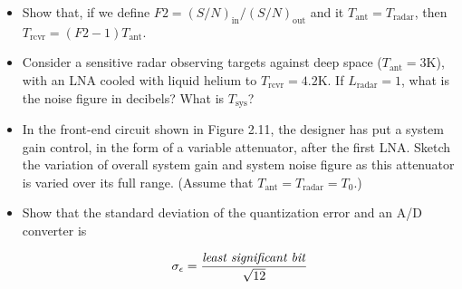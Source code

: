 \documentclass[letterpaper,10pt]{article}\usepackage[]{graphicx}\usepackage[]{color}
\newcommand{\question}[3]{
\begin{itemize}
\item[{\makebox[1cm]{#1)}}] #2

\vspace{.2in}

#3

\end{itemize}

\vspace{.2in}
}
\begin{document}
\question{2.2}{
Show that, if we define $F2=(S/N)_\text{in}/(S/N)_\text{out}$ and it $T_\text{ant}=T_\text{radar}$, then $T_\text{rcvr}=(F2-1)T_\text{ant}$.
}{}

\question{2.3}{
Consider a sensitive radar observing targets against deep space ($T_\text{ant}=3\text{K}$), with an LNA cooled with liquid helium to $T_\text{rcvr}=4.2\text{K}$.  If $L_\text{radar}=1$, what is the noise figure in decibels?  What is $T_\text{sys}$?
}{}

\question{2.4}{
In the front-end circuit shown in Figure 2.11, the designer has put a system gain control, in the form of a variable attenuator, after the first LNA.  Sketch the variation of overall system gain and system noise figure as this attenuator is varied over its full range. (Assume that $T_\text{ant}=T_\text{radar}=T_0$.)
}{}

\question{2.5}{
Show that the standard deviation of the quantization error and an A/D converter is

\begin{equation*}
\sigma_\epsilon = \frac{\text{\textit{least significant bit}}}{\sqrt{12}}
\end{equation*}
}{}
\end{document}
